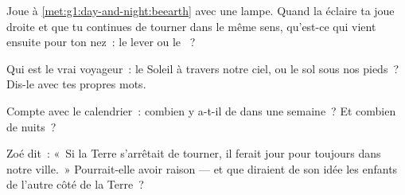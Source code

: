 \begin{exercise}[$\star$]\label{exo:g1:day-and-night:6}
Joue à \cref{met:g1:day-and-night:beearth} avec une lampe. Quand la
 éclaire ta joue droite et que tu continues de tourner dans le
même sens, qu'est-ce qui vient ensuite pour ton nez~: le lever ou le
~?
\end{exercise}

\begin{exercise}[$\star$]\label{exo:g1:day-and-night:7}
Qui est le vrai voyageur~: le Soleil à travers notre ciel, ou le sol
sous nos pieds~? Dis-le avec tes propres mots.
\end{exercise}

\begin{exercise}[$\star$]\label{exo:g1:day-and-night:8}
Compte avec le calendrier~: combien y a-t-il de  dans
une semaine~? Et combien de nuits~?
\end{exercise}

\begin{exercise}[$\star\star$]\label{exo:g1:day-and-night:9}
Zoé dit~: «~Si la Terre s'arrêtait de tourner, il ferait jour pour
toujours dans notre ville.~» Pourrait-elle avoir raison --- et que
diraient de son idée les enfants de l'autre côté de la Terre~?
\end{exercise}
